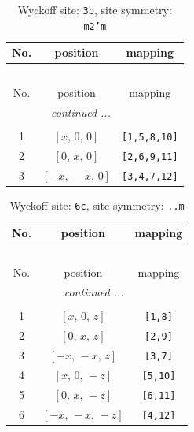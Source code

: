 \documentclass[fleqn,8pt]{jsarticle}
\begin{document}
\begin{longtable}{ccc}
\caption{Wyckoff site: {\tt 3b}, site symmetry: {\tt m2'm}}
 \\
 \hline \hline
No. & position & mapping \\ \hline \endfirsthead

\multicolumn{2}{l}{\tablename\ \thetable{}} \\
 \hline \hline
No. & position & mapping \\ \hline \endhead

 \hline \hline
\multicolumn{2}{r}{\footnotesize\it continued ...} \\ \endfoot

 \hline \hline
\multicolumn{2}{r}{} \\ \endlastfoot

1 & $\left[ x,\, 0,\, 0 \right]$ & {\tt [1,5,8,10]} \\ \hline
2 & $\left[ 0,\, x,\, 0 \right]$ & {\tt [2,6,9,11]} \\ \hline
3 & $\left[ - x,\, - x,\, 0 \right]$ & {\tt [3,4,7,12]} \\
\end{longtable}
\renewcommand{\arraystretch}{1.2}
\begin{longtable}{ccc}
\caption{Wyckoff site: {\tt 6c}, site symmetry: {\tt ..m}}
 \\
 \hline \hline
No. & position & mapping \\ \hline \endfirsthead

\multicolumn{2}{l}{\tablename\ \thetable{}} \\
 \hline \hline
No. & position & mapping \\ \hline \endhead

 \hline \hline
\multicolumn{2}{r}{\footnotesize\it continued ...} \\ \endfoot

 \hline \hline
\multicolumn{2}{r}{} \\ \endlastfoot

1 & $\left[ x,\, 0,\, z \right]$ & {\tt [1,8]} \\ \hline
2 & $\left[ 0,\, x,\, z \right]$ & {\tt [2,9]} \\ \hline
3 & $\left[ - x,\, - x,\, z \right]$ & {\tt [3,7]} \\ \hline
4 & $\left[ x,\, 0,\, - z \right]$ & {\tt [5,10]} \\ \hline
5 & $\left[ 0,\, x,\, - z \right]$ & {\tt [6,11]} \\ \hline
6 & $\left[ - x,\, - x,\, - z \right]$ & {\tt [4,12]} \\
\end{longtable}
\end{document}
